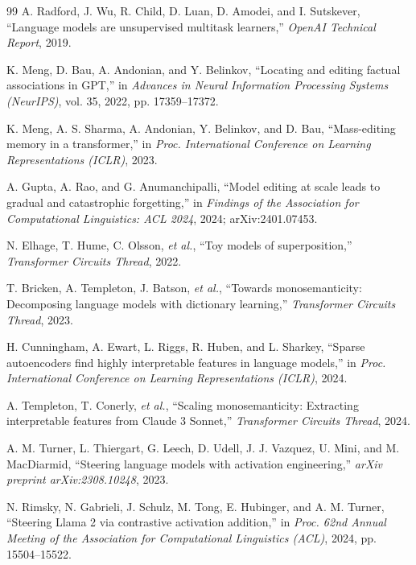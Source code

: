 \documentclass[12pt,a4paper]{report}
\begin{document}
\clearpage
{}
\renewcommand{\bibname}{References}
\begin{thebibliography}{99}
 A. Radford, J. Wu, R. Child, D. Luan, D. Amodei, and I. Sutskever, ``Language models are unsupervised multitask learners,'' \textit{OpenAI Technical Report}, 2019.

 K. Meng, D. Bau, A. Andonian, and Y. Belinkov, ``Locating and editing factual associations in GPT,'' in \textit{Advances in Neural Information Processing Systems (NeurIPS)}, vol. 35, 2022, pp. 17359--17372.

 K. Meng, A. S. Sharma, A. Andonian, Y. Belinkov, and D. Bau, ``Mass-editing memory in a transformer,'' in \textit{Proc. International Conference on Learning Representations (ICLR)}, 2023.

 A. Gupta, A. Rao, and G. Anumanchipalli, ``Model editing at scale leads to gradual and catastrophic forgetting,'' in \textit{Findings of the Association for Computational Linguistics: ACL 2024}, 2024; arXiv:2401.07453.

 N. Elhage, T. Hume, C. Olsson, \textit{et al.}, ``Toy models of superposition,'' \textit{Transformer Circuits Thread}, 2022.

 T. Bricken, A. Templeton, J. Batson, \textit{et al.}, ``Towards monosemanticity: Decomposing language models with dictionary learning,'' \textit{Transformer Circuits Thread}, 2023.

 H. Cunningham, A. Ewart, L. Riggs, R. Huben, and L. Sharkey, ``Sparse autoencoders find highly interpretable features in language models,'' in \textit{Proc. International Conference on Learning Representations (ICLR)}, 2024.

 A. Templeton, T. Conerly, \textit{et al.}, ``Scaling monosemanticity: Extracting interpretable features from Claude 3 Sonnet,'' \textit{Transformer Circuits Thread}, 2024.

 A. M. Turner, L. Thiergart, G. Leech, D. Udell, J. J. Vazquez, U. Mini, and M. MacDiarmid, ``Steering language models with activation engineering,'' \textit{arXiv preprint arXiv:2308.10248}, 2023.

 N. Rimsky, N. Gabrieli, J. Schulz, M. Tong, E. Hubinger, and A. M. Turner, ``Steering Llama 2 via contrastive activation addition,'' in \textit{Proc. 62nd Annual Meeting of the Association for Computational Linguistics (ACL)}, 2024, pp. 15504--15522.


\end{thebibliography}
\end{document}
